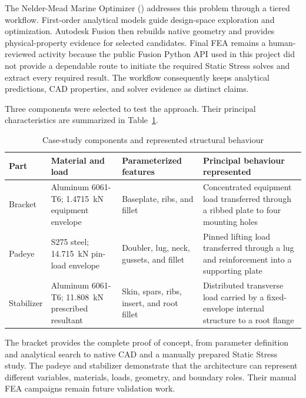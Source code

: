 The Nelder-Mead Marine Optimizer (\NEMO) addresses this problem through a
tiered workflow. First-order analytical models guide design-space exploration
and optimization. Autodesk Fusion then rebuilds native geometry and provides
physical-property evidence for selected candidates. Final FEA remains a
human-reviewed activity because the public Fusion Python API used in this
project did not provide a dependable route to initiate the required Static
Stress solves and extract every required result. The workflow consequently
keeps analytical predictions, CAD properties, and solver evidence as distinct
claims.

Three components were selected to test the approach. Their principal
characteristics are summarized in Table~\ref{tab:case-study-summary}.

\begin{table}[H]
\centering
\caption{Case-study components and represented structural behaviour}
\label{tab:case-study-summary}
\begin{tabularx}{\textwidth}{p{}p{}XX}
\toprule
\textbf{Part} & \textbf{Material and load} & \textbf{Parameterized features} &
\textbf{Principal behaviour represented}\\
\midrule
Bracket & Aluminum 6061-T6; 1.4715~kN equipment envelope &
Baseplate, ribs, and fillet &
Concentrated equipment load transferred through a ribbed plate to four
mounting holes\\

Padeye & S275 steel; 14.715~kN pin-load envelope &
Doubler, lug, neck, gussets, and fillet &
Pinned lifting load transferred through a lug and reinforcement into a
supporting plate\\

Stabilizer & Aluminum 6061-T6; 11.808~kN prescribed resultant &
Skin, spars, ribs, insert, and root fillet &
Distributed transverse load carried by a fixed-envelope internal structure
to a root flange\\
\bottomrule
\end{tabularx}
\end{table}

The bracket provides the complete proof of concept, from parameter definition
and analytical search to native CAD and a manually prepared Static Stress
study. The padeye and stabilizer demonstrate that the architecture can
represent different variables, materials, loads, geometry, and boundary
roles. Their manual FEA campaigns remain future validation work.

